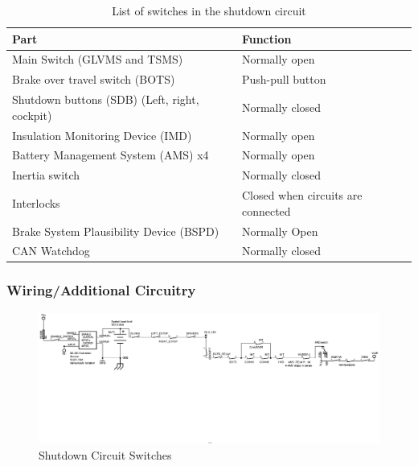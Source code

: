 \documentclass{article}
\begin{document}

            \begin{table}[H]
                \centering
                \begin{tabular}{|l|l|}
                \hline
                    Part & Function \\ \hline
                    Main Switch (GLVMS and TSMS) & Normally open \\ \hline
                    Brake over travel switch (BOTS) & Push-pull button \\ \hline
                    Shutdown buttons (SDB) (Left, right, cockpit) & Normally closed \\ \hline
                    Insulation Monitoring Device (IMD) & Normally open \\ \hline
                    Battery Management System  (AMS) x4 & Normally open \\ \hline
                    Inertia switch & Normally closed \\ \hline
                    Interlocks & Closed when circuits are connected \\ \hline
                    Brake System Plausibility Device (BSPD) & Normally Open \\ \hline
                    CAN Watchdog & Normally closed \\ \hline
                \end{tabular}
                \caption{List of switches in the shutdown circuit}
                \label{switchlist}
            \end{table}

        \subsubsection{Wiring/Additional Circuitry}


            \begin{figure}[H]
                \centering
                \includegraphics[width = 1 \textwidth]{shutdownswitches}
                \caption{Shutdown Circuit Switches}
                \label{switchesonly}
            \end{figure}
\end{document}
